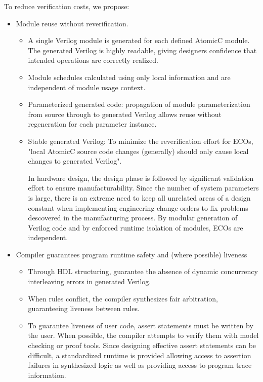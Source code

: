 To reduce verification costs, we propose:
\begin{itemize}
\item Module reuse without reverification.
\begin{itemize}
\item A single Verilog module is generated for each defined AtomicC module.
The generated Verilog is highly readable, giving designers confidence that
intended operations are correctly realized.
\item Module schedules calculated using only local information and are independent of module usage context.
\item Parameterized generated code: propagation of module parameterization from
source through to generated Verilog allows reuse without regeneration for each parameter instance.
\item Stable generated Verilog: To minimize the reverification effort for ECOs,
"local AtomicC source code changes (generally) should only cause local changes to generated Verilog".

In hardware design, the design phase is followed by significant validation effort
to ensure manufacturability.  Since the number of system parameters is
large, there is an extreme need to keep all unrelated areas of a design constant
when implementing engineering change orders to fix problems descovered
in the manufacturing process.
By modular generation of Verilog code and by enforced runtime isolation
of modules, ECOs are independent.

\end{itemize}

\item Compiler guarantees program runtime safety and (where possible) liveness
\begin{itemize}
\item Through HDL structuring, guarantee the absence of dynamic concurrency interleaving errors in generated Verilog.
\item When rules conflict, the compiler synthesizes fair arbitration, guaranteeing liveness between rules.
\item To guarantee liveness of user code, assert statements must be written by the user.
When possible, the compiler attempts to verify them with model checking or proof tools.
Since designing effective assert statements can be difficult, a standardized runtime
is provided allowing access to assertion failures in synthesized logic as well
as providing access to program trace information.
\end{itemize}


\end{itemize}
